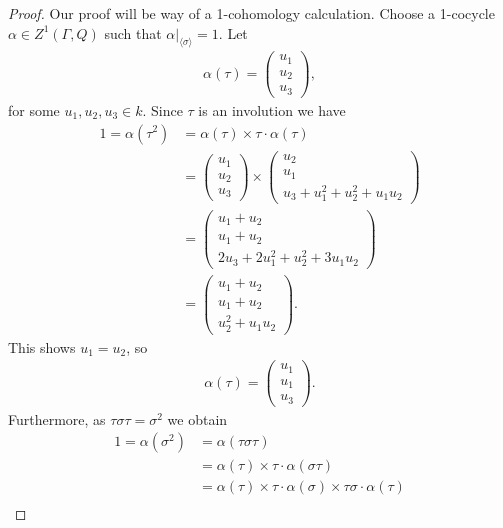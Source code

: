 \begin{proof}
	Our proof will be way of a 1-cohomology calculation. Choose a 1-cocycle $\alpha \in Z^1(\Gamma, Q)$ such that $\alpha|_{\langle \sigma \rangle} = 1$. Let
	\begin{align*}
		\alpha(\tau) = \left(\begin{matrix} u_1 \\ u_2 \\ u_3 \end{matrix} \right),
	\end{align*}
	for some $u_1, u_2, u_3 \in k$. Since $\tau$ is an involution we have
	\begin{align*}
		1 = \alpha(\tau^2) &= \alpha(\tau) \times \tau\cdot\alpha(\tau)\\
		&= \left(\begin{matrix} u_1 \\ u_2 \\ u_3\end{matrix} \right) \times 
		\left(\begin{matrix} u_2 \\ u_1 \\ u_3 + u_1^2 + u_2^2 + u_1u_2\end{matrix} \right) \\
		&= \left(\begin{matrix} u_1 + u_2 \\ u_1 + u_2 \\ 2u_3 + 2u_1^2 + u_2^2 + 3u_1u_2\end{matrix} \right)\\
		&= \left(\begin{matrix} u_1 + u_2 \\ u_1 + u_2 \\ u_2^2 + u_1u_2\end{matrix} \right).
	\end{align*}
	This shows $u_1 = u_2$, so
	\begin{align*}
		\alpha(\tau) = \left(\begin{matrix} u_1 \\ u_1 \\ u_3\end{matrix} \right).
	\end{align*}
	Furthermore, as $\tau\sigma\tau = \sigma^2$ we obtain
	\begin{align*}
		1 = \alpha(\sigma^2) &= \alpha(\tau\sigma\tau) \\
		&= \alpha(\tau) \times \tau\cdot\alpha(\sigma\tau)\\
		&= \alpha(\tau) \times \tau\cdot\alpha(\sigma) \times \tau\sigma\cdot\alpha(\tau) \\

\end{align*}
\end{proof}
